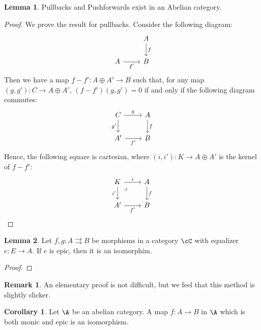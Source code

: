 \documentclass[12pt]{amsart}
\theoremstyle{definition}
\newtheorem{lemma}{Lemma}
\newtheorem{remark}{Remark}
\newtheorem{corollary}{Corollary}
\begin{document}
\begin{lemma}
  \label{lemma:pullbacks exist}
  Pullbacks and Pushforwards exist in an Abelian category.
\end{lemma}

\begin{proof}
  We prove the result for pullbacks.
  Consider the following diagram:
  \[
    \begin{tikzcd}
      &A\ar[d,"f"] \\
      A\ar[r,"f'"'] & B
    \end{tikzcd}
  \] 
  Then we have a map $f-f':A\oplus A'\to B$ such that, for any map $(g,g'):C\to A\oplus A'$, $(f-f')(g,g')=0$ if and only if the following diagram commutes:
  \[
    \begin{tikzcd}
      C\ar[d,"g'"']\ar[r,"g"]&A\ar[d,"f"] \\
      A'\ar[r,"f'"'] & B
    \end{tikzcd}
  \] 
  Hence, the following square is cartesian, where $(i,i'):K\to A\oplus A'$ is the kernel of $f-f'$:
  \[
    \begin{tikzcd}
      K\ar[d,"i'"']\ar[r,"i"]\ar[dr,phantom,very near start, "\lrcorner"]&A\ar[d,"f"] \\
      A'\ar[r,"f'"'] & B
    \end{tikzcd}
  \] 
\end{proof}

\begin{lemma}
  \label{lemma:epic equalizer}
  Let $f,g:A\rightrightarrows B$ be morphisms in a category $\cC$ with equalizer $e:E\to A$.
  If $e$ is epic, then it is an isomorphim.
\end{lemma}

\begin{proof}
  
\end{proof}

\begin{remark}
  An elementary proof is not difficult, but we feel that this method is slightly slicker.
\end{remark}

\begin{corollary}
  \label{corollary:iso is monic epic}
  Let $\A$ be an abelian category.
  A map $f:A\to B$ in $\A$ which is both monic and epic is an isomorphism.
\end{corollary}
\end{document}
